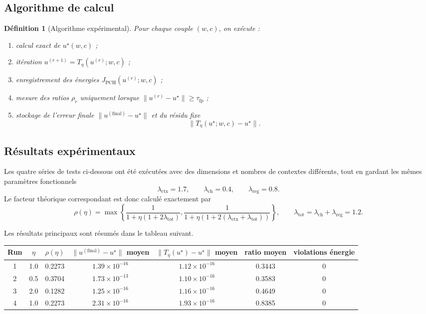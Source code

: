 \documentclass[11pt,a4paper]{article}
\newtheorem{definition}{Définition}[section]
\newcommand{\1}{\mathbf 1}
\begin{document}
\subsection{Algorithme de calcul}

\begin{definition}[Algorithme expérimental]
Pour chaque couple \((w,c)\), on exécute :

\begin{enumerate}
    \item calcul exact de \(u^\star(w,c)\) ;
    \item itération \(u^{(r+1)}=T_\eta(u^{(r)};w,c)\) ;
    \item enregistrement des énergies \(J_{\mathrm{PCH}}(u^{(r)};w,c)\) ;
    \item mesure des ratios \(\rho_r\) uniquement lorsque \(\|u^{(r)}-u^\star\|\ge\tau_{\mathrm{fp}}\) ;
    \item stockage de l'erreur finale \(\|u^{(\mathrm{final})}-u^\star\|\) et du résidu fixe
    \[
    \|T_\eta(u^\star;w,c)-u^\star\|.
    \]
\end{enumerate}
\end{definition}

\subsection{Résultats expérimentaux}

Les quatre séries de tests ci-dessous ont été exécutées avec des dimensions et nombres de contextes différents, tout en gardant les mêmes paramètres fonctionnels
\[
\lambda_{\mathrm{ctx}}=1.7,
\qquad
\lambda_{\mathrm{ch}}=0.4,
\qquad
\lambda_{\mathrm{reg}}=0.8.
\]
Le facteur théorique correspondant est donc calculé exactement par
\[
\rho(\eta)
=
\max\left\{
\frac{1}{1+\eta(1+2\lambda_{\mathrm{tot}})},
\frac{1}{1+\eta(1+2(\lambda_{\mathrm{ctx}}+\lambda_{\mathrm{tot}}))}
\right\},
\qquad
\lambda_{\mathrm{tot}}=\lambda_{\mathrm{ch}}+\lambda_{\mathrm{reg}}=1.2.
\]

Les résultats principaux sont résumés dans le tableau suivant.

\begin{center}
\begin{tabular}{|c|c|c|c|c|c|c|}
\hline
Run & \(\eta\) & \(\rho(\eta)\) & \(\|u^{(\mathrm{final})}-u^\star\|\) moyen & \(\|T_\eta(u^\star)-u^\star\|\) moyen & ratio moyen & violations énergie \\
\hline
1 & 1.0 & 0.2273 & \(1.39\times 10^{-16}\) & \(1.12\times 10^{-16}\) & 0.3443 & 0 \\
2 & 0.5 & 0.3704 & \(1.73\times 10^{-13}\) & \(1.10\times 10^{-16}\) & 0.3583 & 0 \\
3 & 2.0 & 0.1282 & \(1.25\times 10^{-16}\) & \(1.16\times 10^{-16}\) & 0.4649 & 0 \\
4 & 1.0 & 0.2273 & \(2.31\times 10^{-16}\) & \(1.93\times 10^{-16}\) & 0.8385 & 0 \\
\hline
\end{tabular}
\end{center}
\end{document}
